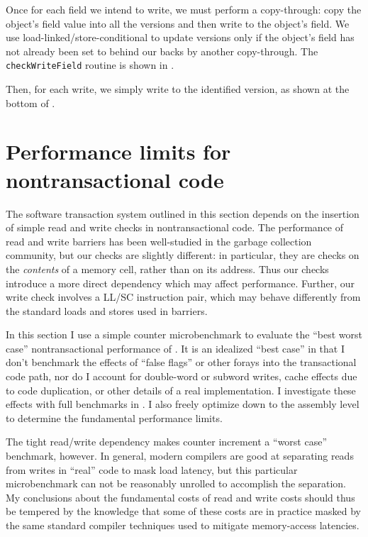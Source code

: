 Once for each field we intend to write, we must perform a
copy-through: copy the object's field value into all the versions and
then write \FLAG to the object's field.  We use
load-linked/store-conditional to update versions only if the object's
field has not already been set to \FLAG behind our backs by another
copy-through.  The {\tt checkWriteField} routine is shown in
.

Then, for each write, we simply write to the identified version, as
shown at the bottom of .

\section{Performance limits for nontransactional code}
\label{sec:counter-bench}
The software transaction system outlined in this section depends on
the insertion of simple read and write checks in nontransactional
code.  The performance of read and write barriers has been
well-studied in the garbage collection community, but our checks are
slightly different: in particular, they are checks on the
\textit{contents} of a memory cell, rather than on its address.  
Thus our checks
introduce a more direct dependency which may affect performance.
Further, our write check involves a LL/SC instruction pair, which may
behave differently from the standard loads and stores used in
barriers.

In this section I use a simple counter microbenchmark to evaluate the
``best worst case'' nontransactional performance of \apex.
It is an idealized ``best case'' in that I don't benchmark
the effects of ``false flags'' or other forays into the transactional
code path, nor do I account for double-word or subword writes,
cache effects due to code duplication, or other details of a real
implementation.  I investigate these effects with full
benchmarks in .  I also freely
optimize down to the assembly level to determine the fundamental
performance limits.  

The tight read/write dependency makes counter increment
a ``worst case'' benchmark, however.  In general,
modern compilers are good at separating reads from writes in
``real'' code to mask load latency, but this particular microbenchmark
can not be reasonably unrolled to accomplish the separation.  My
conclusions about the fundamental costs of read and write costs should
thus be tempered by the knowledge that some of these costs are in
practice masked by the same standard compiler techniques used to
mitigate memory-access latencies.

